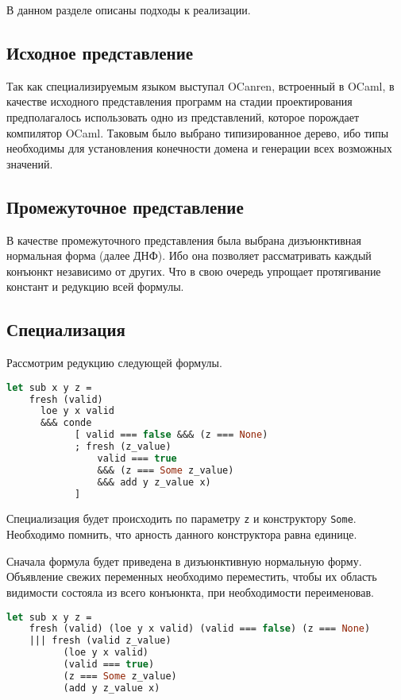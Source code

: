 
В данном разделе описаны подходы к реализации.

\subsection{Исходное представление}
Так как специализируемым языком выступал OCanren, встроенный в OCaml, в качестве исходного представления программ на стадии проектирования предполагалось использовать одно из представлений, которое порождает компилятор OCaml. Таковым было выбрано типизированное дерево, ибо типы необходимы для установления
конечности домена и генерации всех возможных значений.

\subsection{Промежуточное представление}

В качестве промежуточного представления была выбрана дизъюнктивная нормальная форма (далее ДНФ). Ибо она позволяет рассматривать каждый конъюнкт независимо от других. Что в свою очередь упрощает протягивание констант и редукцию всей формулы.

\subsection{Специализация}
 Рассмотрим редукцию следующей формулы.

\begin{lstlisting}[caption=Отношение вычитания, language=OCaml, frame=single, label = sub]
 let sub x y z =
    fresh (valid)
      loe y x valid
      &&& conde
            [ valid === false &&& (z === None)
            ; fresh (z_value)
                valid === true 
                &&& (z === Some z_value) 
                &&& add y z_value x)
            ]
\end{lstlisting}

Специализация будет происходить по параметру \verb|z| и конструктору \verb|Some|. Необходимо помнить, что арность данного конструктора равна единице.

Сначала формула будет приведена в дизъюнктивную нормальную форму. Объявление свежих переменных необходимо переместить, чтобы их область видимости состояла из всего конъюнкта, при необходимости переименовав. 

\begin{lstlisting}[caption=Отношение в ДНФ, language=OCaml, frame=single, label = sub]
 let sub x y z =
    fresh (valid) (loe y x valid) (valid === false) (z === None)
    ||| fresh (valid z_value)  
          (loe y x valid)
          (valid === true) 
          (z === Some z_value) 
          (add y z_value x)
        
\end{lstlisting}

